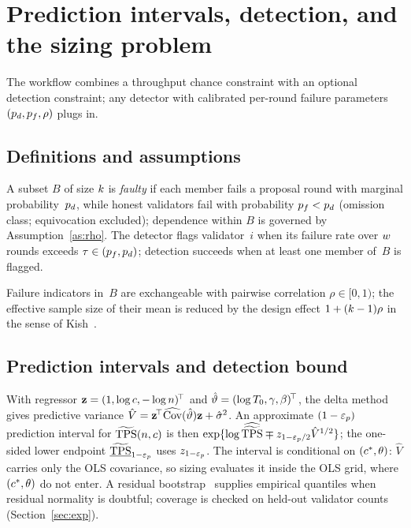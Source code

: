\section{Prediction intervals, detection, and the sizing problem}
\label{sec:sizing}

The workflow combines a throughput chance constraint with an optional detection
constraint; any detector with calibrated per-round failure parameters
$(p_{d},p_{f},\rho)$ plugs in.

\subsection{Definitions and assumptions}

\begin{Def}
\label{def:faults}
A subset $B$ of size $k$ is \emph{faulty} if each member fails a proposal
round with marginal probability~$p_{d}$, while honest validators fail with
probability $p_{f}<p_{d}$ (omission class; equivocation excluded); dependence within
$B$ is governed by Assumption~\ref{as:rho}. The detector
flags validator~$i$ when its failure rate over $w$ rounds exceeds
$\tau\in(p_{f},p_{d})$; detection succeeds when at least one member of~$B$ is
flagged.
\end{Def}

\begin{Assumption}
\label{as:rho}
Failure indicators in~$B$ are exchangeable with pairwise correlation
$\rho\in[0,1)$; the effective sample size of their mean is reduced by the design
effect $1+(k-1)\rho$ in the sense of Kish~\cite{kish1965}.
\end{Assumption}

\subsection{Prediction intervals and detection bound}
\label{sec:detection}

With regressor $\mathbf{z}=(1,\log c,-\log n)^{\!\top}$ and
$\hat\vartheta=(\log T_{0},\gamma,\beta)^{\!\top}$, the delta
method~\cite{seber2003} gives predictive variance
$\hat{V}=\mathbf{z}^{\!\top}\widehat{\mathrm{Cov}}(\hat\vartheta)\mathbf{z}+\hat\sigma^{2}$.
An approximate $(1-\varepsilon_{p})$ prediction interval for $\widetilde{\mathrm{TPS}}(n,c)$ is then
$\exp\{\log\widehat{\widetilde{\mathrm{TPS}}}\mp z_{1-\varepsilon_{p}/2}\hat{V}^{1/2}\}$;\label{st:pi}
the one-sided lower endpoint $\underline{\widetilde{\mathrm{TPS}}}_{1-\varepsilon_{p}}$ uses $z_{1-\varepsilon_{p}}$.
The interval is conditional on $(c^{\ast},\theta)$: $\hat V$ carries only the OLS
covariance, so sizing evaluates it inside the OLS grid, where $(c^{\ast},\theta)$ do
not enter. A residual bootstrap~\cite{efron1993} supplies empirical quantiles
when residual normality is doubtful; coverage is checked on held-out validator
counts (Section~\ref{sec:exp}).

